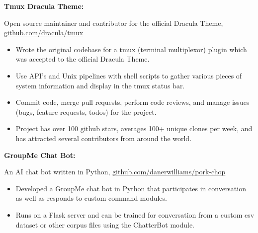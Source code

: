 \documentclass[letterpaper,10pt]{article}
\newcommand{\resumeItem}[2]{
  \item\small{
    {#1}{#2 \vspace{-2pt}}
  }
}
\newcommand{\resumeSubItem}[2]{\resumeItem{#1}{#2}\vspace{-4pt}}
\begin{document}
{      \resumeSubItem{\textbf{Tmux Dracula Theme: }}
      { Open source maintainer and contributor for the official Dracula Theme, \href{https://github.com/dracula/tmux}{github.com/dracula/tmux}
         \vspace{-5pt}
         \begin{itemize}
          \item Wrote the original codebase for a tmux (terminal multiplexor) plugin which was accepted to the official Dracula Theme.
          \vspace{-2pt}
          \item Use API's and Unix pipelines with shell scripts to gather various pieces of system information and display in the tmux status bar.
          \vspace{-2pt}
          \item Commit code, merge pull requests, perform code reviews, and manage issues (bugs, feature requests, todos) for the project.
          \vspace{-2pt}
          \item Project has over 100 github stars, averages 100+ unique clones per week, and has attracted several contributors from around the world.
         \end{itemize}
      }

     \vspace{-2pt}

      \resumeSubItem{\textbf{GroupMe Chat Bot: }}
     { An AI chat bot written in Python, \href{https://github.com/danerwilliams/pork-chop}{github.com/danerwilliams/pork-chop}
        \vspace{-5pt}
        \begin{itemize}
            \item Developed a GroupMe chat bot in Python that participates in conversation as well as responds to custom command modules.
            \vspace{-2pt}
            \item Runs on a Flask server and can be trained for conversation from a custom csv dataset or other corpus files using the ChatterBot module. 
        \end{itemize}
     }

    \vspace{-2pt}

}
\end{document}
